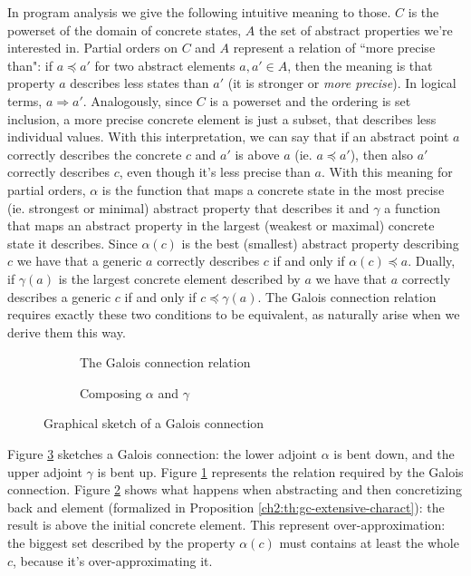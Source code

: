 In program analysis we give the following intuitive meaning to those. $C$ is the powerset of the domain of concrete states, $A$ the set of abstract properties we're interested in. Partial orders on $C$ and $A$ represent a relation of ``more precise than": if $a \preceq a'$ for two abstract elements $a, a' \in A$, then the meaning is that property $a$ describes less states than $a'$ (it is stronger or \textit{more precise}). In logical terms, $a \Rightarrow a'$. Analogously, since $C$ is a powerset and the ordering is set inclusion, a more precise concrete element is just a subset, that describes less individual values. With this interpretation, we can say that if an abstract point $a$ correctly describes the concrete $c$ and $a'$ is above $a$ (ie. $a \preceq a'$), then also $a'$ correctly describes $c$, even though it's less precise than $a$.
With this meaning for partial orders, $\alpha$ is the function that maps a concrete state in the most precise (ie. strongest or minimal) abstract property that describes it and $\gamma$ a function that maps an abstract property in the largest (weakest or maximal) concrete state it describes. Since $\alpha(c)$ is the best (smallest) abstract property describing $c$ we have that a generic $a$ correctly describes $c$ if and only if $\alpha(c) \preceq a$. Dually, if $\gamma(a)$ is the largest concrete element described by $a$ we have that $a$ correctly describes a generic $c$ if and only if $c \preceq \gamma(a)$. The Galois connection relation requires exactly these two conditions to be equivalent, as naturally arise when we derive them this way.

\begin{figure}[ht]
	\centering
	\begin{subfigure}{.5\textwidth}
		\centering
		{
			\selectfont
			\def\svgwidth{.8\textwidth}
			
		}
		\caption{The Galois connection relation}
		\label{ch2:fig:gc-sketch:relation}
	\end{subfigure}%
	\begin{subfigure}{.5\textwidth}
		\centering
		{
			\selectfont
			\def\svgwidth{.8\textwidth}
			
		}
		\caption{Composing $\alpha$ and $\gamma$}
		\label{ch2:fig:gc-sketch:gamma-alpha-c}
	\end{subfigure}
	\caption{Graphical sketch of a Galois connection}
	\label{ch2:fig:gc-sketch}
\end{figure}
Figure \ref{ch2:fig:gc-sketch} sketches a Galois connection: the lower adjoint $\alpha$ is bent down, and the upper adjoint $\gamma$ is bent up.
Figure \ref{ch2:fig:gc-sketch:relation} represents the relation required by the Galois connection. Figure \ref{ch2:fig:gc-sketch:gamma-alpha-c} shows what happens when abstracting and then concretizing back and element (formalized in Proposition \ref{ch2:th:gc-extensive-charact}): the result is above the initial concrete element. This represent over-approximation: the biggest set described by the property $\alpha(c)$ must contains at least the whole $c$, because it's over-approximating it.

